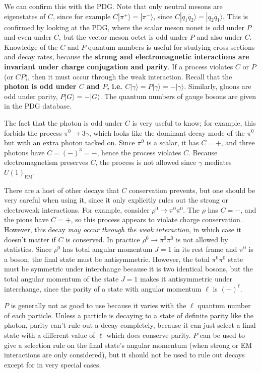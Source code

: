 \documentclass[11pt, oneside]{article}   	%
\theoremstyle{definition}
\numberwithin{equation}{subsection}		%
\begin{document}
We can confirm this with the PDG. Note that only neutral mesons are eigenstates of $C$, since for example 
$C|\pi^+\rangle = |\pi^-\rangle$, since $C|q_1\overline q_2\rangle = |q_2\overline q_1\rangle$. This is confirmed by looking at the PDG, 
where the scalar meson nonet is odd under $P$ and even under $C$, but the vector meson octet is odd under $P$ and also under $C$.
Knowledge of the $C$ and $P$ quantum numbers is useful for studying cross sections and decay rates, because the \textbf{strong and 
electromagnetic interactions are invariant under charge conjugation and parity}. If a process violates $C$ or $P$ (or $CP$), then it 
must occur through the weak interaction. Recall that the \textbf{photon is odd under $C$ and $P$, i.e. $C|\gamma\rangle = 
P|\gamma\rangle = - |\gamma\rangle$}. Similarly, gluons are odd under parity, $P|G\rangle = -|G\rangle$. The quantum numbers of 
gauge bosons are given in the PDG database. 

The fact that the photon is odd under $C$ is very useful to know; for example, this forbids the process $\pi^0\rightarrow 3\gamma$, which looks 
like the dominant decay mode of the $\pi^0$ but with an extra photon tacked on. Since $\pi^0$ is a scalar, it has $C = +$, and three photons have 
$C = (-)^3 = -$, hence the process violates $C$. Because electromagnetism preserves $C$, the process is not allowed since $\gamma$ mediates 
$U(1)_\mathrm{EM}$. 

There are a host of other decays that $C$ conservation prevents, but one should be very careful when using it, since it 
only explicitly rules out the strong or electroweak interactions. For example, consider $\rho^0\rightarrow\pi^0\pi^0$. The 
$\rho$ has $C = -$, and the pions have $C = +$, so this process appears to violate charge conservation. However, this decay 
\textit{may occur through the weak interaction}, in which case it doesn't matter if $C$ is conserved. In practice $\rho^0\rightarrow
\pi^0\pi^0$ is not allowed by statistics. Since $\rho^0$ has total angular momentum $J = 1$ in its rest frame and $\pi^0$ is a boson, 
the final state must be antisymmetric. However, the total $\pi^0\pi^0$ state must be symmetric under interchange because it is two 
identical bosons, but the total angular momentum of the state $J = 1$ makes it antisymmetric under interchange, since the parity of 
a state with angular momentum $\ell$ is $(-)^\ell$. 

$P$ is generally not as good to use because it varies with the $\ell$ quantum number of each particle. Unless a particle is decaying to a state 
of definite parity like the photon, parity can't rule out a decay completely, because it can just select a final state with a different value of $\ell$ 
which does conserve parity. $P$ can be used to give a selection rule on the final state's angular momentum (when strong or EM interactions 
are only considered), but it should not be used to rule out decays except for in very special cases. 
\end{document}
